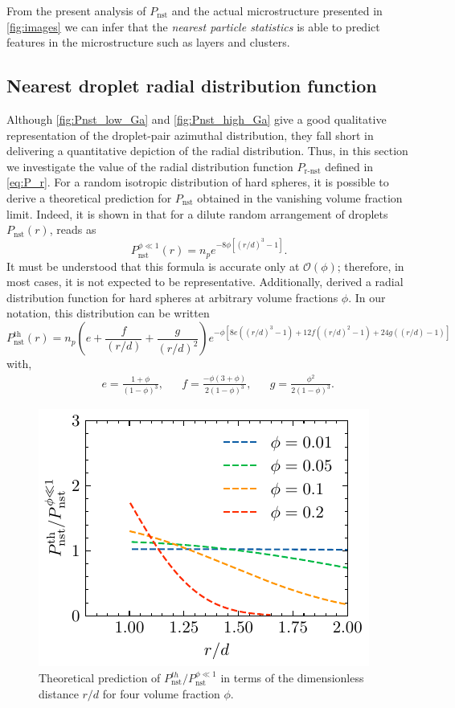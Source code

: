 From the present analysis of $P_\text{nst}$ and the actual microstructure presented in \ref{fig:images} we can infer that the \textit{nearest particle statistics} is able to predict features in the microstructure such as layers and clusters. 


\subsection{Nearest droplet radial distribution function }

Although \ref{fig:Pnst_low_Ga} and \ref{fig:Pnst_high_Ga} give a good qualitative representation of the droplet-pair azimuthal distribution, they fall short in delivering a quantitative depiction of the radial distribution.
Thus, in this section we investigate the value of the radial distribution function $P_\text{r-nst}$ defined in \ref{eq:P_r}. 
For a random isotropic distribution of hard spheres, it is possible to derive a theoretical prediction for $P_\text{nst}$ obtained in the vanishing volume fraction limit. 
Indeed, it is shown in \citet{zhang2021ensemble} that for a dilute random arrangement of droplets $P_\text{nst}(r)$, reads as
\begin{equation}
    P_\text{nst}^{\phi \ll 1}(r) = n_p e^{- 8\phi\left[(r/d)^3-1\right]}.
    \label{eq:Pnst_dilute}
\end{equation}
It must be understood that this formula is accurate only at $\mathcal{O}(\phi)$; therefore, in most cases, it is not expected to be representative.
Additionally, \citet{torquato1990nearest} derived a radial distribution function for hard spheres at arbitrary volume fractions $\phi$. In our notation, this distribution can be written
\begin{equation}
    P_\text{nst}^\text{th}(r) = 
        n_p\left(e+\frac{f}{(r/d)} +\frac{g}{(r/d)^2}\right)
    e^{-\phi\left[8e\left((r/d)^3-1\right)+12 f\left((r/d)^2-1\right)+24g\left((r/d)-1\right)\right]}
    \label{eq:torquato}
\end{equation}
with, 
\begin{align*}
    && e= \frac{1+\phi}{(1-\phi)^3},
    && f= \frac{-\phi (3+\phi)}{2(1-\phi)^3},
    && g= \frac{\phi^2}{2(1-\phi)^3}.
\end{align*}
\begin{figure}
    \centering
    \includegraphics[height=0.3\textwidth]{image/HOMOGENEOUS_final/Dist/Theory.pdf}
    \caption{
        Theoretical prediction of $P_\text{nst}^{th}/P_\text{nst}^{\phi \ll 1}$ in terms of the dimensionless distance $r/d$ for four volume fraction $\phi$. 
    }
    \label{fig:torquato}
\end{figure}
